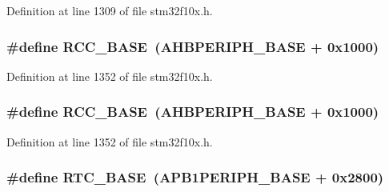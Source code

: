 Definition at line 1309 of file stm32f10x.\+h.

\subsubsection[{\texorpdfstring{R\+C\+C\+\_\+\+B\+A\+SE}{RCC_BASE}}]{\setlength{\rightskip}{0pt plus 5cm}\#define R\+C\+C\+\_\+\+B\+A\+SE~({\bf A\+H\+B\+P\+E\+R\+I\+P\+H\+\_\+\+B\+A\+SE} + 0x1000)}\hypertarget{group___peripheral__memory__map_ga0e681b03f364532055d88f63fec0d99d}{}\label{group___peripheral__memory__map_ga0e681b03f364532055d88f63fec0d99d}


Definition at line 1352 of file stm32f10x.\+h.

\subsubsection[{\texorpdfstring{R\+C\+C\+\_\+\+B\+A\+SE}{RCC_BASE}}]{\setlength{\rightskip}{0pt plus 5cm}\#define R\+C\+C\+\_\+\+B\+A\+SE~({\bf A\+H\+B\+P\+E\+R\+I\+P\+H\+\_\+\+B\+A\+SE} + 0x1000)}\hypertarget{group___peripheral__memory__map_ga0e681b03f364532055d88f63fec0d99d}{}\label{group___peripheral__memory__map_ga0e681b03f364532055d88f63fec0d99d}


Definition at line 1352 of file stm32f10x.\+h.

\subsubsection[{\texorpdfstring{R\+T\+C\+\_\+\+B\+A\+SE}{RTC_BASE}}]{\setlength{\rightskip}{0pt plus 5cm}\#define R\+T\+C\+\_\+\+B\+A\+SE~({\bf A\+P\+B1\+P\+E\+R\+I\+P\+H\+\_\+\+B\+A\+SE} + 0x2800)}\hypertarget{group___peripheral__memory__map_ga4265e665d56225412e57a61d87417022}{}\label{group___peripheral__memory__map_ga4265e665d56225412e57a61d87417022}


